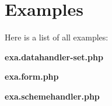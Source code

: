 \section{Examples}
Here is a list of all examples:\begin{DoxyCompactItemize}
\item 
{\bf exa.datahandler-\/set.php}
\item 
{\bf exa.form.php}
\item 
{\bf exa.schemehandler.php}
\end{DoxyCompactItemize}
